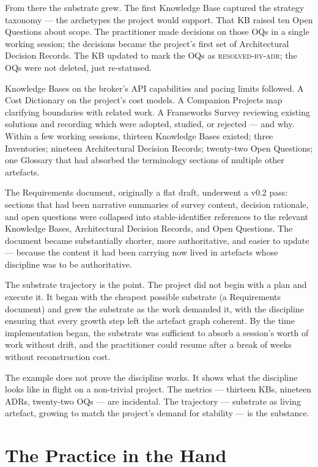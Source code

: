 \documentclass[11pt,a4paper,twocolumn]{article}
\begin{document}
From there the substrate grew. The first Knowledge Base captured
the strategy taxonomy --- the archetypes the project would support.
That KB raised ten Open Questions about scope. The practitioner
made decisions on those OQs in a single working session; the
decisions became the project's first set of Architectural Decision
Records. The KB updated to mark the OQs as
\textsc{resolved-by-adr}; the OQs were not deleted, just
re-statused.

Knowledge Bases on the broker's API capabilities and pacing limits
followed. A Cost Dictionary on the project's cost models. A
Companion Projects map clarifying boundaries with related work. A
Frameworks Survey reviewing existing solutions and recording which
were adopted, studied, or rejected --- and why. Within a few
working sessions, thirteen Knowledge Bases existed; three
Inventories; nineteen Architectural Decision Records; twenty-two
Open Questions; one Glossary that had absorbed the terminology
sections of multiple other artefacts.

The Requirements document, originally a flat draft, underwent a
v0.2 pass: sections that had been narrative summaries of survey
content, decision rationale, and open questions were collapsed into
stable-identifier references to the relevant Knowledge Bases,
Architectural Decision Records, and Open Questions. The document
became substantially shorter, more authoritative, and easier to
update --- because the content it had been carrying now lived in
artefacts whose discipline was to be authoritative.

The substrate trajectory is the point. The project did not begin
with a plan and execute it. It began with the cheapest possible
substrate (a Requirements document) and grew the substrate as the
work demanded it, with the discipline ensuring that every growth
step left the artefact graph coherent. By the time implementation
began, the substrate was sufficient to absorb a session's worth of
work without drift, and the practitioner could resume after a break
of weeks without reconstruction cost.

The example does not prove the discipline works. It shows what the
discipline looks like in flight on a non-trivial project. The
metrics --- thirteen KBs, nineteen ADRs, twenty-two OQs --- are
incidental. The trajectory --- substrate as living artefact,
growing to match the project's demand for stability --- is the
substance.

\section{The Practice in the Hand}
\label{sec:practice}
\end{document}
